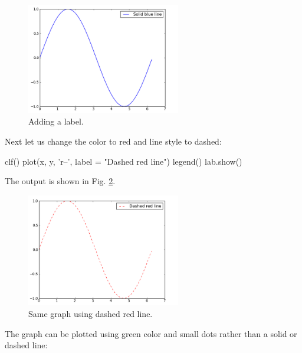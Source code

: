 \begin{figure}[!ht]
\begin{center}
\includegraphics[width=0.6\textwidth]{imgp/plot2.png}
\end{center}
\vspace{-6mm}
\caption{Adding a label.}
\label{fig:plot2}
\end{figure}
\newpage
\noindent
Next let us change the color to red and line style to dashed: 

\begin{bluecode}
clf()
plot(x, y, 'r--', label = "Dashed red line")
legend()
lab.show()
\end{bluecode}
The output is shown in Fig. \ref{fig:plot3}.\\[-7mm]


\begin{figure}[!ht]
\begin{center}
\includegraphics[width=0.6\textwidth]{imgp/plot3.png}
\end{center}
\vspace{-6mm}
\caption{Same graph using dashed red line.}
\vspace{-1cm}
\label{fig:plot3}
\end{figure}
\newpage
\noindent
The graph can be plotted using green color and small dots rather than 
a solid or dashed line:

